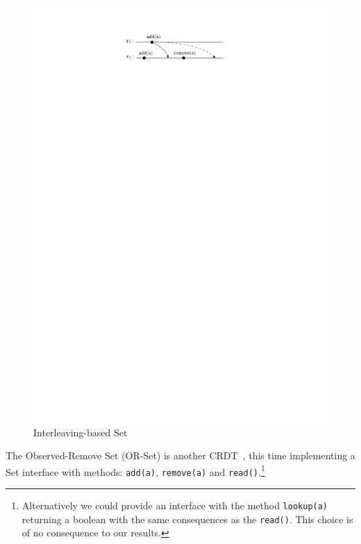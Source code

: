 \begin{figure}
  \centering
  \includegraphics[width=0.45 \textwidth]{./figures/OR-Set-simple}
  \caption{Interleaving-based Set}
  \label{fig:or-set-simple}
\end{figure}
The Observed-Remove Set (OR-Set) is another CRDT~\cite{ShapiroPBZ11},
this time implementing a Set interface with methods: \lstinline|add(a)|,
\lstinline|remove(a)| and \lstinline|read()|.\footnote{Alternatively
  we could provide an interface with the method \lstinline|lookup(a)|
  returning a boolean with the same consequences as the
  \lstinline|read()|. This choice is of no consequence to our results.}
%

